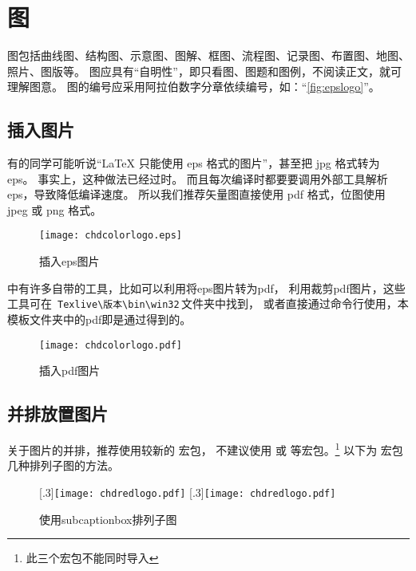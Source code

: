\section{图}
图包括曲线图、结构图、示意图、图解、框图、流程图、记录图、布置图、地图、照片、图版等。
图应具有“自明性”，即只看图、图题和图例，不阅读正文，就可理解图意。
图的编号应采用阿拉伯数字分章依续编号，如：“\autoref{fig:epslogo}”。

\subsection{插入图片}
有的同学可能听说“\LaTeX{} 只能使用 eps 格式的图片”，甚至把 jpg 格式转为 eps。
事实上，这种做法已经过时。
而且每次编译时都要要调用外部工具解析 eps，导致降低编译速度。
所以我们推荐矢量图直接使用 pdf 格式，位图使用 jpeg 或 png 格式。
\begin{figure}[htb]
  \centering
  \texttt{[image: chdcolorlogo.eps]}
  \caption{插入eps图片}
  \label{fig:epslogo}
\end{figure}

中有许多自带的工具，比如可以利用将eps图片转为pdf，
利用裁剪pdf图片，这些工具可在
\,\verb|Texlive|\verb|\版本|\verb|\bin|\verb|\win32|\,文件夹中找到，
或者直接通过命令行使用，本模板文件夹中的pdf即是通过得到的。
\begin{figure}[htb]
  \centering
  \texttt{[image: chdcolorlogo.pdf]}
  \caption{插入pdf图片}
  \label{fig:pdflogo}
\end{figure}

\subsection{并排放置图片}

关于图片的并排，推荐使用较新的  宏包，
不建议使用  或  等宏包。\footnote{此三个宏包不能同时导入}
以下为 宏包几种排列子图的方法。
\begin{figure}
  \centering
  [.3\linewidth]{\texttt{[image: chdredlogo.pdf]}}
  [.3\linewidth]{\texttt{[image: chdredlogo.pdf]}}
  \caption{使用\textsf{subcaptionbox}排列子图}
\end{figure}

